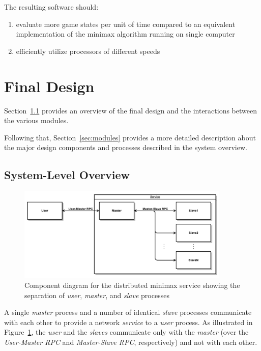 \documentclass[pdftex,12pt,a4paper]{article}
\begin{document}
The resulting software should:
\begin{enumerate}
\item evaluate more game states per unit of time compared to an equivalent implementation of the minimax algorithm running on single computer
\item\label{itm:obj-efficiency} efficiently utilize processors of different speeds
\end{enumerate}


\section{Final Design}

Section~\ref{sec:system} provides an overview of the final design and the interactions between the various modules.

Following that, Section~\ref{sec:modules} provides a more detailed description about the major design components and processes described in the system overview.

%
%
\subsection{System-Level Overview}\label{sec:system}

\begin{figure}[h]
\begin{center}
\includegraphics[width=0.9\textwidth]{img/component-diagram}
\caption{Component diagram for the distributed minimax service showing the separation of \emph{user}, \emph{master}, and \emph{slave} processes}
\label{fig:component-diagram}
\end{center}
\end{figure}

A single \emph{master} process and a number of identical \emph{slave} processes communicate with each other to provide a network \emph{service} to a \emph{user} process. As illustrated in Figure~\ref{fig:component-diagram}, the \emph{user} and the \emph{slaves} communicate only with the \emph{master} (over the \emph{User-Master RPC} and \emph{Master-Slave RPC}, respectively) and not with each other.
\end{document}
